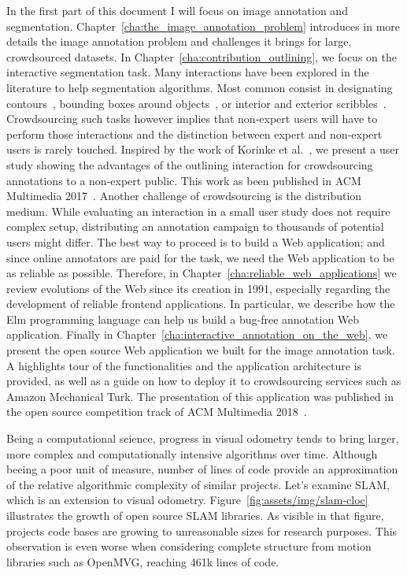 In the first part of this document I will focus on image annotation and segmentation.
Chapter~\ref{cha:the_image_annotation_problem} introduces in more details
the image annotation problem and challenges it brings for large, crowdsourced datasets.
In Chapter~\ref{cha:contribution_outlining}, we focus on the interactive segmentation task.
Many interactions have been explored in the literature to help segmentation algorithms.
Most common consist in designating contours~\cite{russell2008labelme},
bounding boxes around objects~\cite{rother_grabcut:_2004},
or interior and exterior scribbles~\cite{mcguinness2010comparative}.
Crowdsourcing such tasks however implies that non-expert users will have to perform
those interactions and the distinction between expert and non-expert users is rarely touched.
Inspired by the work of Korinke et al.~\cite{korinke_intuitive_2015, korinke_exploring_2015},
we present a user study showing the advantages of the outlining interaction
for crowdsourcing annotations to a non-expert public.
This work as been published in ACM Multimedia 2017~\cite{pizenberg2017outlining}.
Another challenge of crowdsourcing is the distribution medium.
While evaluating an interaction in a small user study does not require complex setup,
distributing an annotation campaign to thousands of potential users might differ.
The best way to proceed is to build a Web application;
and since online annotators are paid for the task,
we need the Web application to be as reliable as possible.
Therefore, in Chapter~\ref{cha:reliable_web_applications} we review evolutions of the Web
since its creation in 1991, especially regarding the development
of reliable frontend applications.
In particular, we describe how the Elm programming language can help us
build a bug-free annotation Web application.
Finally in Chapter~\ref{cha:interactive_annotation_on_the_web},
we present the open source Web application we built for the image annotation task.
A highlights tour of the functionalities and the application architecture is provided,
as well as a guide on how to deploy it to crowdsourcing services
such as Amazon Mechanical Turk.
The presentation of this application was published in the open source competition track
of ACM Multimedia 2018~\cite{pizenberg2018annotation}.


Being a computational science, progress in visual odometry tends to bring larger,
more complex and computationally intensive algorithms over time.
Although beeing a poor unit of measure, number of lines of code provide
an approximation of the relative algorithmic complexity of similar projects.
Let's examine SLAM, which is an extension to visual odometry.
Figure~\ref{fig:assets/img/slam-cloc} illustrates the growth of open source SLAM libraries.
As visible in that figure, projects code bases are growing to unreasonable sizes for research purposes.
This observation is even worse when considering complete structure from motion
libraries such as OpenMVG, reaching 461k lines of code.

